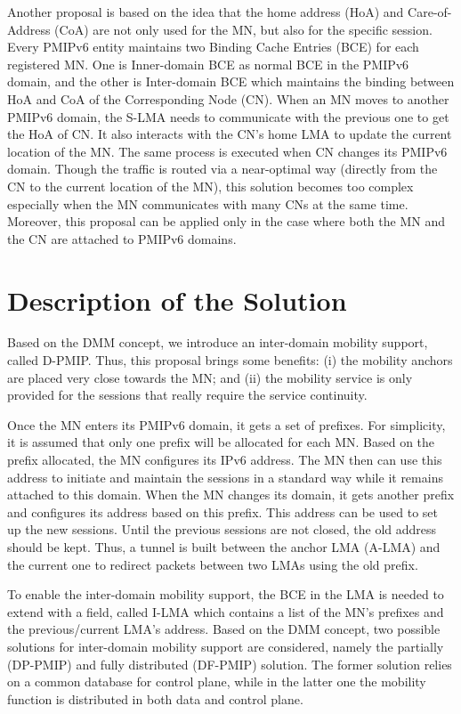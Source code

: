 Another proposal \cite{draft-ma} is based on the idea that the home address (HoA) and Care-of-Address (CoA) are not only used for the MN, but also for the specific session. Every PMIPv6 entity maintains two Binding Cache Entries (BCE) for each registered MN. One is Inner-domain BCE as normal BCE in the PMIPv6 domain, and the other is Inter-domain BCE which maintains the binding between HoA and CoA of the Corresponding Node (CN). When an MN moves to another PMIPv6 domain, the S-LMA needs to communicate with the previous one to get the HoA of CN. It also interacts with the CN's home LMA to update the current location of the MN. The same process is executed when CN changes its PMIPv6 domain. Though the traffic is routed via a near-optimal way (directly from the CN to the current location of the MN), this solution becomes too complex especially when the MN communicates with many CNs at the same time. Moreover, this proposal can be applied only in the case where both the MN and the CN are attached to PMIPv6 domains. 

\section{Description of the Solution} \label{ch9:solution_description}
Based on the DMM concept, we introduce an inter-domain mobility support, called D-PMIP. Thus, this proposal brings some benefits: (i) the mobility anchors are placed very close towards the MN; and (ii) the mobility service is only provided for the sessions that really require the service continuity.  

Once the MN enters its PMIPv6 domain, it gets a set of prefixes. For simplicity, it is assumed that only one prefix will be allocated for each MN. Based on the prefix allocated, the MN configures its IPv6 address. The MN then can use this address to initiate and maintain the sessions in a standard way while it remains attached to this domain. When the MN changes its domain, it gets another prefix and configures its address based on this prefix. This address can be used to set up the new sessions. Until the previous sessions are not closed, the old address should be kept. Thus, a tunnel is built between the anchor LMA (A-LMA) and the current one to redirect packets between two LMAs using the old prefix. 

To enable the inter-domain mobility support, the BCE in the LMA is needed to extend with a field, called I-LMA which contains a list of the MN's prefixes and the previous/current LMA's address. Based on the DMM concept, two possible solutions for inter-domain mobility support are considered, namely the partially (DP-PMIP) and fully distributed (DF-PMIP) solution. The former solution relies on a common database for control plane, while in the latter one the mobility function is distributed in both data and control plane. 
